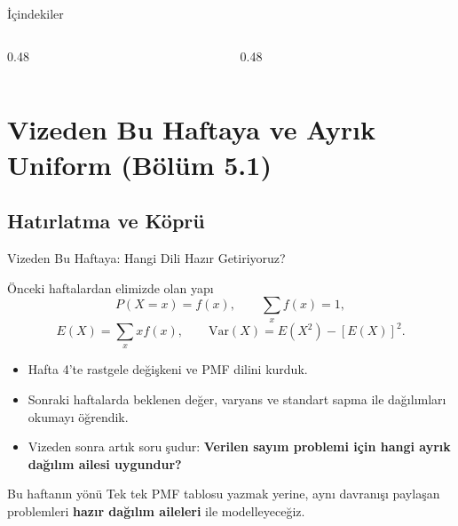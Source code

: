 \documentclass[light]{lutbeamer}
\begin{document}
\begin{frame}{İçindekiler}
  \scriptsize
  \begin{columns}[T]
    \begin{column}{0.48\textwidth}
      \tableofcontents[sections={1-3}]
    \end{column}
    \begin{column}{0.48\textwidth}
      \tableofcontents[sections={4-10}]
    \end{column}
  \end{columns}
\end{frame}

\section{Vizeden Bu Haftaya ve Ayrık Uniform (Bölüm 5.1)}
\subsection{Hatırlatma ve Köprü}

\begin{frame}{Vizeden Bu Haftaya: Hangi Dili Hazır Getiriyoruz?}
    \small
    \begin{block}{Önceki haftalardan elimizde olan yapı}
        \[
        P(X=x)=f(x), \qquad \sum_x f(x)=1,
        \]
        \[
        E(X)=\sum_x x f(x), \qquad \mathrm{Var}(X)=E(X^2)-[E(X)]^2.
        \]
    \end{block}

    \begin{itemize}
        \item Hafta 4'te rastgele değişkeni ve PMF dilini kurduk.
        \item Sonraki haftalarda beklenen değer, varyans ve standart sapma ile dağılımları okumayı öğrendik.
        \item Vizeden sonra artık soru şudur: \textbf{Verilen sayım problemi için hangi ayrık dağılım ailesi uygundur?}
    \end{itemize}

    \begin{exampleblock}{Bu haftanın yönü}
        Tek tek PMF tablosu yazmak yerine, aynı davranışı paylaşan problemleri \textbf{hazır dağılım aileleri} ile modelleyeceğiz.
    \end{exampleblock}
\end{frame}
\end{document}
